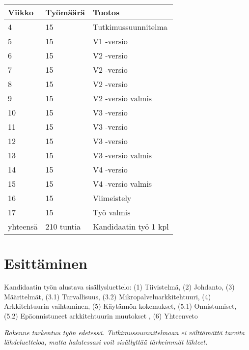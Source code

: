 \documentclass[12pt,a4paper,finnish,oneside]{article}
\begin{document}
\begin{tabular}{|p{20mm}|p{30mm}|p{95mm}|}
\hline
Viikko   & Työmäärä   & Tuotos                \\ \hline
4        & 15         & Tutkimussuunnitelma   \\ \hline
5        & 15         & V1 -versio            \\ \hline
6        & 15         & V2 -versio            \\ \hline
7        & 15         & V2 -versio            \\ \hline
8        & 15         & V2 -versio            \\ \hline
9        & 15         & V2 -versio valmis     \\ \hline
10       & 15         & V3 -versio            \\ \hline
11       & 15         & V3 -versio            \\ \hline
12       & 15         & V3 -versio            \\ \hline
13       & 15         & V3 -versio valmis     \\ \hline
14       & 15         & V4 -versio            \\ \hline
15       & 15         & V4 -versio valmis     \\ \hline
16       & 15         & Viimeistely           \\ \hline
17       & 15         & Työ valmis            \\ \hline
yhteensä & 210 tuntia & Kandidaatin työ 1 kpl \\ \hline
\end{tabular}


\section{Esittäminen}

Kandidaatin työn alustava sisällysluettelo:
(1) Tiivistelmä,
(2) Johdanto,
(3) Määritelmät,
(3.1) Turvallisuus,
(3.2) Mikropalveluarkkitehtuuri,
(4) Arkkitehtuurin vaihtaminen,
(5) Käytännön kokemukset,
(5.1) Onnistumiset,
(5.2) Epäonnistuneet arkkitehtuurin muutokset ,
(6) Yhteenveto

%

\emph{Rakenne tarkentuu työn edetessä. Tutkimussuunnitelmaan ei välttämättä tarvita lähdeluetteloa, mutta halutessasi voit sisällyttää tärkeimmät lähteet.}

%


% 

\renewcommand{\refname}{Lähteet}  %



\end{document}
